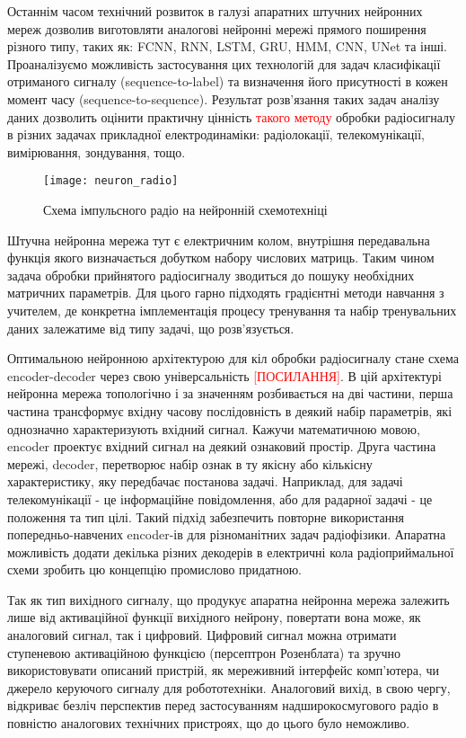 Останнім часом технічний розвиток в галузі апаратних штучних нейронних мереж 
дозволив виготовляти аналогові нейронні мережі прямого поширення різного типу,
таких як: FCNN, RNN, LSTM, GRU, HMM, CNN, UNet та інші. Проаналізуємо 
можливість застосування цих технологій для задач класифікації отриманого 
сигналу (sequence-to-label) та визначення його присутності в кожен момент 
часу (sequence-to-sequence). Результат розв'язання таких задач аналізу даних
дозволить оцінити практичну цінність \textcolor{red}{такого методу} обробки 
радіосигналу в різних задачах прикладної електродинаміки: радіолокації, 
телекомунікації, вимірювання, зондування, тощо. 

\begin{figure}[htbp] \begin{center}
\texttt{[image: neuron\_radio]}
\caption{Схема імпульсного радіо на нейронній схемотехніці} 
\label{fig:neural_radio}
\end{center} \end{figure}

Штучна нейронна мережа тут є електричним колом, внутрішня передавальна 
функція якого визначається добутком набору числових матриць. Таким чином 
задача обробки прийнятого радіосигналу зводиться до пошуку необхідних 
матричних параметрів. Для цього гарно підходять градієнтні методи навчання 
з учителем, де конкретна імплементація процесу тренування та набір 
тренувальних даних залежатиме від типу задачі, що розв'язується.

Оптимальною нейронною архітектурою для кіл обробки радіосигналу стане
схема encoder-decoder через свою універсальність \textcolor{red}{[ПОСИЛАННЯ]}. 
В цій архітектурі нейронна мережа топологічно і за значенням розбивається на 
дві частини, перша частина трансформує вхідну часову послідовність в деякий 
набір параметрів, які однозначно характеризують вхідний сигнал. Кажучи 
математичною мовою, encoder проектує вхідний сигнал на деякий ознаковий
простір. Друга частина мережі, decoder, перетворює набір ознак в ту якісну 
або кількісну характеристику, яку передбачає постанова задачі. Наприклад,
для задачі телекомунікації - це інформаційне повідомлення, або для радарної 
задачі - це положення та тип цілі. Такий підхід забезпечить повторне 
використання попередньо-навчених encoder-ів для різноманітних задач 
радіофізики. Апаратна можливість додати декілька різних декодерів в 
електричні кола радіоприймальної схеми зробить цю концепцію промислово 
придатною.

Так як тип вихідного сигналу, що продукує апаратна нейронна мережа залежить
лише від активаційної функції вихідного нейрону, повертати вона може, як 
аналоговий сигнал, так і цифровий. Цифровий сигнал можна отримати ступеневою 
активаційною функцією (персептрон Розенблата) та зручно використовувати 
описаний пристрій, як мереживний інтерфейс комп'ютера, чи джерело керуючого 
сигналу для робототехніки. Аналоговий вихід, в свою чергу, відкриває безліч 
перспектив перед застосуванням надширокосмугового радіо в повністю 
аналогових технічних пристроях, що до цього було неможливо.

